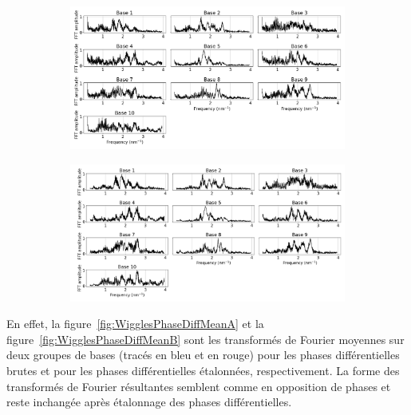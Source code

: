 \begin{figure}[ht!]
    \centering
    \begin{subfigure}{0.8\textwidth}
        \centering
        \includegraphics[width=\textwidth]{Figure_Chap4/20221010_Binary_01_Bin01_SpeDiffPhaseMean_fft_Pola1.png}
        \caption{}
        \label{fig:WigglesPhaseDiffA}
    \end{subfigure}
    \begin{subfigure}{0.8\textwidth}
        \centering
        \includegraphics[width=\textwidth]{Figure_Chap4/20221010_Binary_01_Bin01_SpeDiffPhaseCal_fft_Pola1.png}
        \caption{}
        \label{fig:WigglesPhaseDiffB}
    \end{subfigure}
    \caption[]{}
    \label{fig:WigglesPhaseDiff}
\end{figure}

En effet, la figure~\ref{fig:WigglesPhaseDiffMeanA} et la figure~\ref{fig:WigglesPhaseDiffMeanB} sont les transformés de Fourier moyennes sur deux groupes de bases (tracés en bleu et en rouge) pour les phases différentielles brutes et pour les phases différentielles étalonnées, respectivement. La forme des transformés de Fourier résultantes semblent comme en opposition de phases et reste inchangée après étalonnage des phases différentielles.

